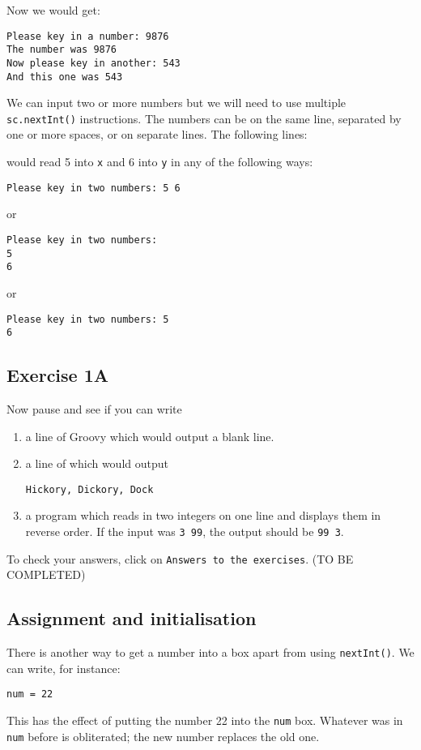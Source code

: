 
Now we would get:
\begin{Verbatim}
Please key in a number: 9876
The number was 9876
Now please key in another: 543
And this one was 543
\end{Verbatim}
We can input two or more numbers but we will need to use multiple \verb!sc.nextInt()! instructions.  The numbers can
be on the same line, separated by one or more spaces, or on separate lines.
The following lines:


would read 5 into \verb!x! and 6 into \verb!y! in any of the following ways:
\begin{Verbatim}
Please key in two numbers: 5 6
\end{Verbatim}
or
\begin{Verbatim}
Please key in two numbers: 
5
6
\end{Verbatim}
or
\begin{Verbatim}
Please key in two numbers: 5
6
\end{Verbatim}

\subsection{Exercise 1A}

Now pause and see if you can write
\begin{enumerate}
\item
a line of Groovy which would output a blank line.
\item
a line of  which would output
\begin{Verbatim}
Hickory, Dickory, Dock
\end{Verbatim}
\item
a program which reads in two integers on one line and displays them
in reverse order.  If the input was \verb!3 99!, the output should be
\verb!99 3!.
\end{enumerate}

To check your answers, click on  \verb!Answers to the exercises!. (TO BE COMPLETED)

\subsection{Assignment and initialisation}

There is another way to get a number into a box apart from using
\verb!nextInt()!.  We can write, for instance:
\begin{Verbatim}
num = 22
\end{Verbatim}
This has the effect of putting the number 22 into the \verb!num! box.  Whatever
was in \verb!num! before is obliterated; the new number replaces the old one.

